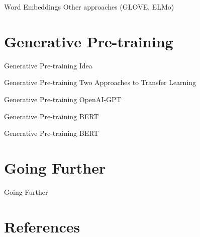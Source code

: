 \documentclass[aspectratio=169]{beamer}
\begin{document}
\begin{frame}{Word Embeddings}
Other approaches (GLOVE, ELMo)
\end{frame}

\section{Generative Pre-training}

\begin{frame}{Generative Pre-training}
Idea
\end{frame}

\begin{frame}{Generative Pre-training}
Two Approaches to Transfer Learning
\end{frame}

\begin{frame}{Generative Pre-training}
OpenAI-GPT
\end{frame}

\begin{frame}{Generative Pre-training}
BERT
\end{frame}

\begin{frame}{Generative Pre-training}
BERT
\end{frame}

\section{Going Further}

\begin{frame}{Going Further}
\end{frame}


\section*{References}

\end{document}
